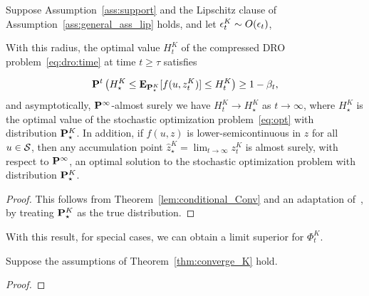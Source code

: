 \begin{theorem}
\label{thm:converge_K}
Suppose Assumption~\ref{ass:support} and the Lipschitz clause of Assumption~\ref{ass:general_ass_lip} holds, and let $\epsilon^K_{t} \sim O(\epsilon_{t})$,  

With this radius, the optimal value $H^K_t$ of the compressed \gls{DRO} problem~\eqref{eq:dro:time} at time $t \geq \tau$ satisfies

\begin{equation*}
	{\mathbf P}^{{t}}\left( H^K_\star \leq \mathbf{E}_{{\mathbf P}^K_\star}[f(u, z^K_{t})] \le H^K_t\right) \ge 1 - \beta_{t},
\end{equation*}
and asymptotically, ${\mathbf P}^\infty$-almost surely we have $H^K_t \rightarrow H^K_\star$ as $t\to\infty$, where $H^K_\star$ is the optimal value of the stochastic optimization problem~\eqref{eq:opt} with distribution ${\mathbf P}^K_\star$.
In addition, if $f(u,z)$ is lower-semicontinuous in $z$ for all $u \in \mathcal{S}$, then any accumulation point $\hat{z}^K_\star = \lim_{t\to \infty}z_t^K$ is almost surely, with respect to ${\mathbf P}^\infty$, an optimal solution to the stochastic optimization problem with distribution ${\mathbf P}^K_\star$.
\end{theorem}
\begin{proof}
This follows from Theorem~\ref{lem:conditional_Conv} and an adaptation of~\cite[Theorem 3.6]{mohajerin2018data}, by treating ${\mathbf P}^K_\star$ as the true distribution.
\end{proof}

With this result, for special cases, we can obtain a limit superior for $\Phi^K_t$.
\begin{theorem}
    \label{thm:lim_phi}
Suppose the assumptions of Theorem~\ref{thm:converge_K} hold.
\end{theorem}
\begin{proof}
\end{proof}

